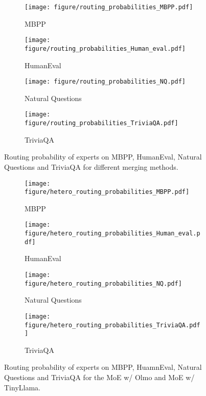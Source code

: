 \begin{figure}[!t]
    \centering
    \begin{subfigure}[b]{0.48\columnwidth}
        \centering
        \texttt{[image: figure/routing\_probabilities\_MBPP.pdf]}
        \caption{MBPP}
    \end{subfigure}
    \hfill
    \begin{subfigure}[b]{0.48\columnwidth}
        \centering
        \texttt{[image: figure/routing\_probabilities\_Human\_eval.pdf]}
        \caption{HumanEval}
    \end{subfigure}
    \hfill
    \begin{subfigure}[b]{0.48\columnwidth}
        \centering
        \texttt{[image: figure/routing\_probabilities\_NQ.pdf]}
        \caption{Natural Questions}
    \end{subfigure}
    \hfill
    \begin{subfigure}[b]{0.48\columnwidth}
        \centering
        \texttt{[image: figure/routing\_probabilities\_TriviaQA.pdf]}
        \caption{TriviaQA}
    \end{subfigure}
    \caption{Routing probability of experts on MBPP, HumanEval, Natural Questions and TriviaQA for different merging methods.}
    \label{fig:supp_routing_prob}
\end{figure}


\begin{figure}[!t]
    \centering
    \begin{subfigure}[b]{0.48\columnwidth}
        \centering
        \texttt{[image: figure/hetero\_routing\_probabilities\_MBPP.pdf]}
        \caption{MBPP}
    \end{subfigure}
    \begin{subfigure}[b]{0.48\columnwidth}
        \centering
        \texttt{[image: figure/hetero\_routing\_probabilities\_Human\_eval.pdf]}
        \caption{HumanEval}
    \end{subfigure}
    \hfill
    \begin{subfigure}[b]{0.48\columnwidth}
        \centering
        \texttt{[image: figure/hetero\_routing\_probabilities\_NQ.pdf]}
        \caption{Natural Questions}
    \end{subfigure}
    \begin{subfigure}[b]{0.48\columnwidth}
        \centering
        \texttt{[image: figure/hetero\_routing\_probabilities\_TriviaQA.pdf]}
        \caption{TriviaQA}
    \end{subfigure}
    \caption{Routing probability of experts on MBPP, HuamnEval, Natural Questions and TriviaQA for the MoE w/ Olmo and MoE w/ TinyLlama.}
    \label{fig:supp_hetero_routing_prob}
\end{figure}


